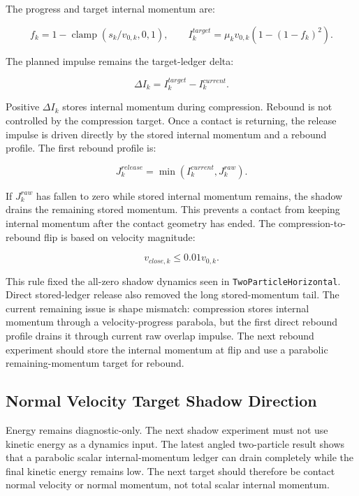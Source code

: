 The progress and target internal momentum are:

\begin{equation}
f_k = 1-\operatorname{clamp}(s_k/v_{0,k},0,1),
\qquad
I^{target}_{k}
=
\mu_k v_{0,k}\left(1-\left(1-f_k\right)^2\right).
\end{equation}

The planned impulse remains the target-ledger delta:

\begin{equation}
\Delta I_k = I^{target}_{k}-I^{current}_{k}.
\end{equation}

Positive \(\Delta I_k\) stores internal momentum during compression.  Rebound
is not controlled by the compression target.  Once a contact is returning, the
release impulse is driven directly by the stored internal momentum and a
rebound profile.  The first rebound profile is:

\begin{equation}
J^{release}_k = \min(I^{current}_k,J^{raw}_k).
\end{equation}

If \(J^{raw}_k\) has fallen to zero while stored internal momentum remains, the
shadow drains the remaining stored momentum.  This prevents a contact from
keeping internal momentum after the contact geometry has ended.  The
compression-to-rebound flip is based on velocity magnitude:

\begin{equation}
v_{close,k} \leq 0.01v_{0,k}.
\end{equation}

This rule fixed the all-zero shadow dynamics seen in
\texttt{TwoParticleHorizontal}.  Direct stored-ledger release also removed the
long stored-momentum tail.  The current remaining issue is shape mismatch:
compression stores internal momentum through a velocity-progress parabola, but
the first direct rebound profile drains it through current raw overlap impulse.
The next rebound experiment should store the internal momentum at flip and use
a parabolic remaining-momentum target for rebound.

\subsection{Normal Velocity Target Shadow Direction}

Energy remains diagnostic-only.  The next shadow experiment must not use
kinetic energy as a dynamics input.  The latest angled two-particle result
shows that a parabolic scalar internal-momentum ledger can drain completely
while the final kinetic energy remains low.  The next target should therefore
be contact normal velocity or normal momentum, not total scalar internal
momentum.

